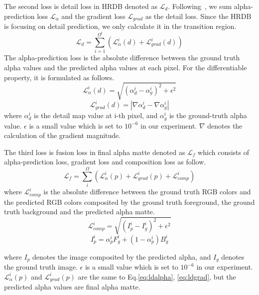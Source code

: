 \documentclass[10pt,twocolumn,letterpaper]{article}
\begin{document}
The second loss is detail loss in HRDB denoted as $\mathcal{L}_{d}$. Following~\cite{xu2017deep, tang2019learning}, we sum alpha-prediction loss $\mathcal{L}_\alpha$ and the gradient loss $\mathcal{L}_{grad}$ as the detail loss. Since the HRDB is focusing on detail prediction, we only calculate it in the transition region.
\begin{equation} 
\mathcal{L}_{d} = \sum_{i=1}^{\Omega^t}(\mathcal{L}_\alpha^i(d) + \mathcal{L}_{grad}^i(d))
\label{eq:ld}
\end{equation}
The alpha-prediction loss is the absolute difference between the ground truth alpha values and the predicted alpha values at each pixel. For the differentiable property, it is formulated as follows.
\begin{equation} \mathcal{L}_\alpha^i(d) = \sqrt{(\alpha_d^i - \alpha_g^i)^2 + \epsilon^2} \label{eq:ldalpha}
\end{equation}
\begin{equation} \mathcal{L}_{grad}^i(d) = |\nabla\alpha_d^i - \nabla\alpha_g^i| \label{eq:ldgrad}
\end{equation}
where $\alpha_{d}^i$ is the detail map value at i-th pixel, and $\alpha_g^i$ is the ground-truth alpha value. $\epsilon$ is a small value which is set to $10^{-6}$ in our experiment. $\nabla$ denotes the calculation of the gradient magnitude.

The third loss is fusion loss in final alpha matte denoted as $\mathcal{L}_f$ which consists of alpha-prediction loss, gradient loss and composition loss as follow.
\begin{equation}
    \mathcal{L}_{f} = \sum_i^\Omega(\mathcal{L}_{\alpha}^i(p) + \mathcal{L}_{grad}^i(p) + \mathcal{L}_{comp}^i)
    \label{eq:lcm}
\end{equation}
where $\mathcal{L}_{comp}^i$ is the absolute difference between the ground truth RGB colors and the predicted RGB colors composited by the ground truth foreground, the ground truth background and the predicted alpha matte.
\begin{equation}
    \mathcal{L}_{comp}^i = \sqrt{(I_p^i - I_g^i)^2 + \epsilon^2}
    \label{eq:lcmcomp}
\end{equation}
\begin{equation}
  I_p^i = \alpha_p^i F_g^i + (1 - \alpha_p^i)B_g^i
  \label{eq:important}
\end{equation}

where $I_p$ denotes the image composited by the predicted alpha, and $I_g$ denotes the ground truth image. $\epsilon$ is a small value which is set to $10^{-6}$ in our experiment. $\mathcal{L}_{\alpha}^i(p)$ and $\mathcal{L}_{grad}^i(p)$ are the same to Eq.\ref{eq:ldalpha}, \ref{eq:ldgrad}, but the predicted alpha values are final alpha matte.
\end{document}
